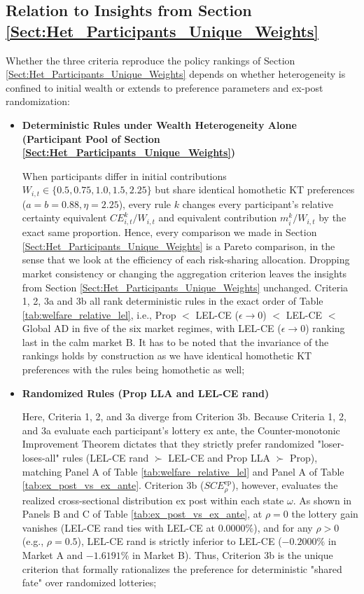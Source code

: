 \subsection{Relation to Insights from Section \ref{Sect:Het_Participants_Unique_Weights}}
Whether the three criteria reproduce the policy rankings of Section \ref{Sect:Het_Participants_Unique_Weights} depends on whether heterogeneity is confined to initial wealth or extends to preference parameters and ex-post randomization:
\begin{itemize}
    \item \textbf{Deterministic Rules under Wealth Heterogeneity Alone (Participant Pool of Section \ref{Sect:Het_Participants_Unique_Weights})}
    
    When participants differ in initial contributions $W_{i,t} \in \{0.5, 0.75, 1.0, 1.5, 2.25\}$ but share identical homothetic KT preferences ($a = b = 0.88, \eta = 2.25$), every rule $k$ changes every participant's relative certainty equivalent $CE_{i,t}^k / W_{i,t}$ and equivalent contribution $m_i^k / W_{i,t}$ by the exact same proportion. Hence, every comparison we made in Section \ref{Sect:Het_Participants_Unique_Weights} is a Pareto comparison, in the sense that we look at the efficiency of each risk-sharing allocation. Dropping market consistency or changing the aggregation criterion leaves the insights from Section \ref{Sect:Het_Participants_Unique_Weights} unchanged. Criteria 1, 2, 3a and 3b all rank deterministic rules in the exact order of Table \ref{tab:welfare_relative_lel}, i.e., Prop $<$ LEL-CE ($\epsilon \to 0$) $<$ LEL-CE $<$ Global AD in five of the six market regimes, with LEL-CE ($\epsilon \to 0$) ranking last in the calm market B. It has to be noted that the invariance of the rankings holds by construction as we have identical homothetic KT preferences with the rules being homothetic as well;
    \item \textbf{Randomized Rules (Prop LLA and LEL-CE rand)}
    
    Here, Criteria 1, 2, and 3a diverge from Criterion 3b. Because Criteria 1, 2, and 3a evaluate each participant's lottery ex ante, the Counter-monotonic Improvement Theorem \citep{Lauzier2024} dictates that they strictly prefer randomized "loser-loses-all" rules (LEL-CE rand $\succ$ LEL-CE and Prop LLA $\succ$ Prop), matching Panel A of Table \ref{tab:welfare_relative_lel} and Panel A of Table \ref{tab:ex_post_vs_ex_ante}. Criterion 3b ($SCE_\rho^{\text{ep}}$), however, evaluates the realized cross-sectional distribution ex post within each state $\omega$. As shown in Panels B and C of Table \ref{tab:ex_post_vs_ex_ante}, at $\rho = 0$ the lottery gain vanishes (LEL-CE rand ties with LEL-CE at $0.0000\%$), and for any $\rho > 0$ (e.g., $\rho = 0.5$), LEL-CE rand is strictly inferior to LEL-CE ($-0.2000\%$ in Market A and $-1.6191\%$ in Market B). Thus, Criterion 3b is the unique criterion that formally rationalizes the preference for deterministic "shared fate" over randomized lotteries;


\end{itemize}
